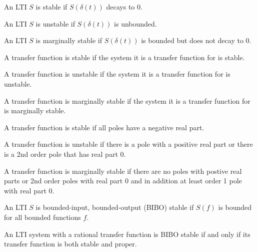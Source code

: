 \documentclass[11pt]{article}
\begin{document}
An LTI \(S\) is stable if \(S(\delta(t))\) decays to 0.

An LTI \(S\) is unstable if \(S(\delta(t))\) is unbounded.

An LTI \(S\) is marginally stable if \(S(\delta(t))\) is bounded but does not decay
to 0.

A transfer function is stable if the system it is a transfer function for is stable.

A transfer function is unstable if the system it is a transfer function for is
unstable.

A transfer function is marginally stable if the system it is a transfer function for
is marginally stable.

A transfer function is stable if all poles have a negative real part.

A transfer function is unstable if there is a pole with a positive real part or
there is a 2nd order pole that has real part 0.

A transfer function is marginally stable if there are no poles with postive real parts
or 2nd order poles with real part 0 and in addition at least order 1 pole with real
part 0.

An LTI \(S\) is bounded-input, bounded-output (BIBO) stable if \(S(f)\) is bounded for
all bounded functions \(f\).

An LTI system with a rational transfer function is BIBO stable if and only if its
transfer function is both stable and proper.
\end{document}
